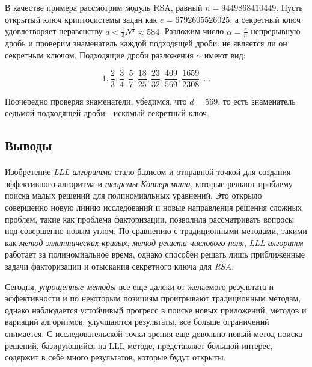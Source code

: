   \begin{example}
    В качестве примера рассмотрим модуль RSA, равный $n = 9449868410449$. Пусть открытый ключ криптосистемы задан как $e = 6792605526025$,
    а секретный ключ удовлетворяет неравенству $d < \frac{1}{3} N^{\frac{1}{4}} \approx 584$. Разложим число $ \alpha = \frac{e}{n} $ непрерывную дробь и проверим 
    знаменатель каждой подходящей дроби: не является ли он секретным ключом. Подходящие дроби разложения $ \alpha $ имеют вид:
    
      \begin{equation}
	        1, \frac{2}{3}, \frac{3}{4}, \frac{5}{7}, \frac{18}{25}, \frac{23}{32}, \frac{409}{569}, \frac{1659}{2308}, \dots
      \end{equation}

    Поочередно проверяя знаменатели, убедимся, что $d = 569$, то есть знаменатель седьмой подходящей дроби - искомый секретный ключ.
  \end{example}
  
  
\subsection{Выводы}

\paragraph{} Изобретение \textit{LLL-алгоритма} стало базисом и отправной точкой для создания эффективного алгоритма и \textit{теоремы Копперсмита}, которые
  решают проблему поиска малых решений для полиномиальных уравнений. Это открыло совершенно новую линию исследований и новые направления решения
  сложных проблем, такие как проблема факторизации, позволила рассматривать вопросы под совершенно новым углом. По сравнению с
  традиционными методами, такими как \textit{метод эллиптических кривых}, \textit{метод решета числового поля}, \textit{LLL-алгоритм} работает за полиномиальное время,
  однако способен решать лишь приближенные задачи факторизации и отыскания секретного ключа для \textit{RSA}.
  
  Сегодня, \textit{упрощенные методы} все еще далеки от желаемого результата и эффективности и по некоторым позициям проигрывают традиционным методам,
  однако наблюдается устойчивый прогресс в поиске новых приложений, методов и вариаций алгоритмов, улучшаются результаты, все больше ограничений
  снимается. С исследовательской точки зрения еще довольно новый метод поиска решений, базирующийся на LLL-методе, представляет большой интерес,
  содержит в себе много результатов, которые будут открыты.

